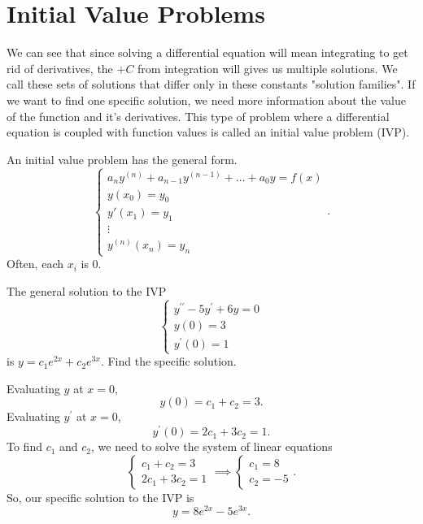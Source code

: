 \section{Initial Value Problems}
\noindent
We can see that since solving a differential equation will mean integrating to get rid of derivatives, the $+ C$ from integration will gives us multiple solutions. We call these sets of solutions that differ only in these constants "solution families". If we want to find one specific solution, we need more information about the value of the function and it's derivatives. This type of problem where a differential equation is coupled with function values is called an initial value problem (IVP).\\

\begin{definition}
	An initial value problem has the general form.
	\begin{equation*}
		\begin{cases}
			a_ny^{(n)} + a_{n-1}y^{(n-1)} + \ldots + a_0y = f(x) \\
			y(x_0) = y_0 \\
			y'(x_1) = y_1 \\
			\vdots \\
			y^{(n)}(x_n) = y_n
		\end{cases}.
	\end{equation*}
	Often, each $x_i$ is 0.
\end{definition}


\begin{example}
	The general solution to the IVP
	\begin{equation*}
		\begin{cases}
			y^{\prime\prime} - 5y^\prime + 6y = 0 \\
			y(0) = 3 \\
			y^\prime(0) = 1
		\end{cases}
	\end{equation*}
	is $y = c_1e^{2x} + c_2e^{3x}$. Find the specific solution.
\end{example}
\noindent
Evaluating $y$ at $x = 0$,
\begin{equation*}
	y(0) = c_1 + c_2 = 3.
\end{equation*}
Evaluating $y^\prime$ at $x = 0$,
\begin{equation*}
	y^\prime(0) = 2c_1 + 3c_2 = 1.
\end{equation*}
To find $c_1$ and $c_2$, we need to solve the system of linear equations
\begin{equation*}
	\begin{cases}
		c_1 + c_2 = 3 \\
		2c_1 + 3c_2 = 1
	\end{cases} \implies \begin{cases}
		c_1 = 8 \\
		c_2 = -5
	\end{cases}.
\end{equation*}
So, our specific solution to the IVP is
\begin{equation*}
	y = 8e^{2x} - 5e^{3x}.
\end{equation*}

